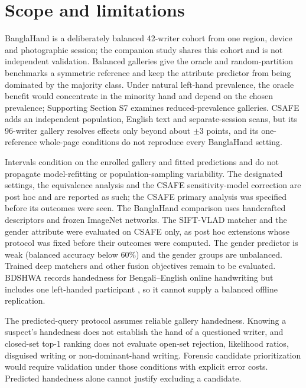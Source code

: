 \documentclass[ASNA,twocolumn]{USG}
\begin{document}
\section{Scope and limitations}
\label{sec:limitations}
BanglaHand is a deliberately balanced 42-writer cohort from one region, device and photographic session; the companion study shares this cohort and is not independent validation. Balanced galleries give the oracle and random-partition benchmarks a symmetric reference and keep the attribute predictor from being dominated by the majority class. Under natural left-hand prevalence, the oracle benefit would concentrate in the minority hand and depend on the chosen prevalence; Supporting Section S7 examines reduced-prevalence galleries. CSAFE adds an independent population, English text and separate-session scans, but its 96-writer gallery resolves effects only beyond about $\pm3$ points, and its one-reference whole-page conditions do not reproduce every BanglaHand setting.

Intervals condition on the enrolled gallery and fitted predictions and do not propagate model-refitting or population-sampling variability. The designated settings, the equivalence analysis and the CSAFE sensitivity-model correction are post hoc and are reported as such; the CSAFE primary analysis was specified before its outcomes were seen. The BanglaHand comparison uses handcrafted descriptors and frozen ImageNet networks. The SIFT-VLAD matcher and the gender attribute were evaluated on CSAFE only, as post hoc extensions whose protocol was fixed before their outcomes were computed. The gender predictor is weak (balanced accuracy below 60\%) and the gender groups are unbalanced. Trained deep matchers and other fusion objectives remain to be evaluated. BDSHWA records handedness for Bengali--English online handwriting but includes one left-handed participant \cite{bdshwa2026}, so it cannot supply a balanced offline replication.

The predicted-query protocol assumes reliable gallery handedness. Knowing a suspect's handedness does not establish the hand of a questioned writer, and closed-set top-1 ranking does not evaluate open-set rejection, likelihood ratios, disguised writing or non-dominant-hand writing. Forensic candidate prioritization would require validation under those conditions with explicit error costs. Predicted handedness alone cannot justify excluding a candidate.
\end{document}
